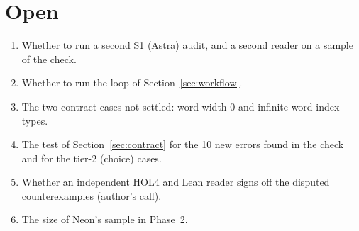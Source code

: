 \documentclass[11pt,a4paper]{article}
\begin{document}
\section{Open}\label{sec:open}
\begin{enumerate}
\item Whether to run a second S1 (Astra) audit, and a second reader on a sample of the check.
\item Whether to run the loop of Section~\ref{sec:workflow}.
\item The two contract cases not settled: word width 0 and infinite word index types.
\item The test of Section~\ref{sec:contract} for the 10 new errors found in the check and for the tier-2 (choice) cases.
\item Whether an independent HOL4 and Lean reader signs off the disputed counterexamples (author's call).
\item The size of Neon's sample in Phase~2.
\end{enumerate}
\end{document}
